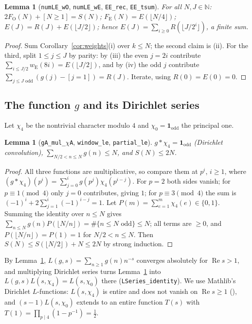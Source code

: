 \documentclass[11pt]{amsart}
\theoremstyle{plain}
\newtheorem{lemma}[theorem]{Lemma}
\theoremstyle{definition}
\newcommand{\code}[1]{\texttt{#1}}
\newcommand{\N}{\mathbb{N}}
\newcommand{\one}{\mathbf{1}}
\newcommand{\re}{\operatorname{Re}}
\newcommand{\wE}{w_{\mathrm E}}
\newcommand{\FE}{F_{\mathrm E}}
\newcommand{\FO}{F_{\mathrm O}}
\begin{document}
\begin{lemma}[\code{numLE\_wO}, \code{numLE\_wE}, \code{EE\_rec}, \code{EE\_tsum}]\label{lem:reduce}
For all $N,J\in\N$: $2\FO(N)+[N\ge1]=S(N)$; $\FE(N)=E(\lfloor N/4\rfloor)$; $E(J)=R(J)+E(\lfloor J/2\rfloor)$; hence $E(J)=\sum_{i\ge0}R(\lfloor J/2^i\rfloor)$, a finite sum.
\end{lemma}

\begin{proof}
Sum Corollary~\ref{cor:weights}(i) over $k\le N$; the second claim is (ii). For the third, split $1\le j\le J$ by parity: by (iii) the even $j=2i$ contribute $\sum_{i\le J/2}\wE(8i)=E(\lfloor J/2\rfloor)$, and by (iv) the odd $j$ contribute $\sum_{j\le J\text{ odd}}(g(j)-[j=1])=R(J)$. Iterate, using $R(0)=E(0)=0$.
\end{proof}

\subsection{The function \texorpdfstring{$g$}{g} and its Dirichlet series}
Let $\chi_4$ be the nontrivial character modulo $4$ and $\chi_0=\one_{\mathrm{odd}}$ the principal one.

\begin{lemma}[\texttt{gA\_mul\_\(\chi\)A}, \code{window\_le}, \code{partial\_le}]\label{lem:linear}
$g*\chi_4=\one_{\mathrm{odd}}$ (Dirichlet convolution), $\sum_{N/2<n\le N}g(n)\le N$, and $S(N)\le2N$.
\end{lemma}

\begin{proof}
All three functions are multiplicative, so compare them at $p^i$, $i\ge1$, where $(g*\chi_4)(p^i)=\sum_{j=0}^ig(p^j)\chi_4(p^{i-j})$. For $p=2$ both sides vanish; for $p\equiv1\pmod4$ only $j=0$ contributes, giving $1$; for $p\equiv3\pmod4$ the sum is $(-1)^i+2\sum_{j=1}^i(-1)^{i-j}=1$. Let $P(m)=\sum_{e=1}^m\chi_4(e)\in\{0,1\}$. Summing the identity over $n\le N$ gives $\sum_{n\le N}g(n)P(\lfloor N/n\rfloor)=\#\{n\le N\text{ odd}\}\le N$; all terms are $\ge0$, and $P(\lfloor N/n\rfloor)=P(1)=1$ for $N/2<n\le N$. Then $S(N)\le S(\lfloor N/2\rfloor)+N\le2N$ by strong induction.
\end{proof}

By Lemma~\ref{lem:linear}, $L(g,s)=\sum_{n\ge1}g(n)n^{-s}$ converges absolutely for $\re s>1$, and multiplying Dirichlet series turns Lemma~\ref{lem:linear} into $L(g,s)L(s,\chi_4)=L(s,\chi_0)$ there (\code{LSeries\_identity}). We use Mathlib's Dirichlet $L$-functions: $L(s,\chi_4)$ is entire and does not vanish on $\re s\ge1$ (), and $(s-1)L(s,\chi_0)$ extends to an entire function $T(s)$ with $T(1)=\prod_{p\mid4}(1-p^{-1})=\tfrac12$.
\end{document}
